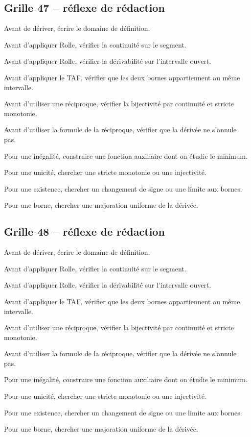 \documentclass[11pt,a4paper]{article}
\begin{document}
\subsection*{Grille 47 -- réflexe de rédaction}

\begin{methodebox}

Avant de dériver, écrire le domaine de définition.

Avant d'appliquer Rolle, vérifier la continuité sur le segment.

Avant d'appliquer Rolle, vérifier la dérivabilité sur l'intervalle ouvert.

Avant d'appliquer le TAF, vérifier que les deux bornes appartiennent au même intervalle.

Avant d'utiliser une réciproque, vérifier la bijectivité par continuité et stricte monotonie.

Avant d'utiliser la formule de la réciproque, vérifier que la dérivée ne s'annule pas.

Pour une inégalité, construire une fonction auxiliaire dont on étudie le minimum.

Pour une unicité, chercher une stricte monotonie ou une injectivité.

Pour une existence, chercher un changement de signe ou une limite aux bornes.

Pour une borne, chercher une majoration uniforme de la dérivée.

\end{methodebox}

\subsection*{Grille 48 -- réflexe de rédaction}

\begin{methodebox}

Avant de dériver, écrire le domaine de définition.

Avant d'appliquer Rolle, vérifier la continuité sur le segment.

Avant d'appliquer Rolle, vérifier la dérivabilité sur l'intervalle ouvert.

Avant d'appliquer le TAF, vérifier que les deux bornes appartiennent au même intervalle.

Avant d'utiliser une réciproque, vérifier la bijectivité par continuité et stricte monotonie.

Avant d'utiliser la formule de la réciproque, vérifier que la dérivée ne s'annule pas.

Pour une inégalité, construire une fonction auxiliaire dont on étudie le minimum.

Pour une unicité, chercher une stricte monotonie ou une injectivité.

Pour une existence, chercher un changement de signe ou une limite aux bornes.

Pour une borne, chercher une majoration uniforme de la dérivée.

\end{methodebox}
\end{document}
